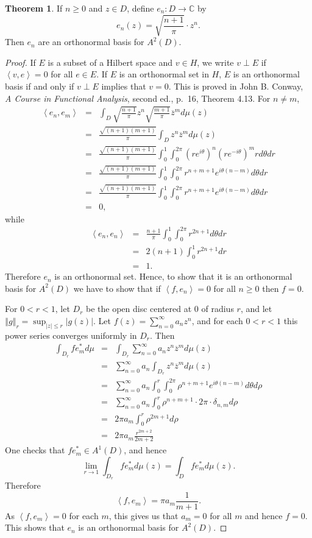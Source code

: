 \documentclass{article}
\newcommand{\inner}[2]{\left\langle #1, #2 \right\rangle}
\newcommand{\norm}[1]{\left\Vert #1 \right\Vert}
\theoremstyle{definition}
\newtheorem{theorem}{Theorem}
\begin{document}
\begin{theorem}
If $n \geq 0$ and $z \in D$, define $e_n:D \to \mathbb{C}$ by 
\[
e_n(z)=\sqrt{\frac{n+1}{\pi}} \cdot z^n.
\]
Then $e_n$ are an orthonormal basis for $A^2(D)$.
\end{theorem}
\begin{proof}
If $E$ is a subset of a Hilbert space and $v \in H$, we write $v \perp E$ if $\inner{v}{e}=0$ for all $e \in E$. If $E$ is an orthonormal set in $H$, $E$ is an orthonormal basis
if and only if $v \perp E$ implies that $v=0$. This is proved in John B. Conway, {\em A Course in Functional Analysis}, second ed., p.~16, Theorem 4.13.
For $n \neq m$,
\begin{eqnarray*}
\inner{e_n}{e_m}&=&\int_D \sqrt{\frac{n+1}{\pi}} z^n \sqrt{\frac{m+1}{\pi}} \overline{z}^m d\mu(z)\\
&=&\frac{ \sqrt{(n+1)(m+1)}}{\pi} \int_D z^n \overline{z}^m d\mu(z)\\
&=&\frac{ \sqrt{(n+1)(m+1)}}{\pi} \int_0^1 \int_0^{2\pi}  (re^{i\theta})^n (re^{-i\theta})^m r d\theta dr\\
&=&\frac{ \sqrt{(n+1)(m+1)}}{\pi} \int_0^1 \int_0^{2\pi}  r^{n+m+1} e^{i\theta(n-m)} d\theta dr\\
&=&\frac{ \sqrt{(n+1)(m+1)}}{\pi} \int_0^1 \int_0^{2\pi}  r^{n+m+1} e^{i\theta(n-m)} d\theta dr\\
&=&0,
\end{eqnarray*}
while
\begin{eqnarray*}
\inner{e_n}{e_n}&=&\frac{n+1}{\pi} \int_0^1 \int_0^{2\pi}  r^{2n+1} d\theta dr\\
&=&2(n+1)\int_0^1 r^{2n+1} dr\\
&=&1.
\end{eqnarray*}
Therefore $e_n$ is an orthonormal set. Hence, to show that it is an orthonormal basis for $A^2(D)$ we have to show that if $\inner{f}{e_n}=0$ for all $n \geq 0$ then
$f=0$.

For $0<r<1$, let $D_r$ be the open disc centered at $0$ of radius $r$, and let $\norm{g}_r=\sup_{|z| \leq r} |g(z)|$. 
Let $f(z)=\sum_{n=0}^\infty a_n z^n$, and for each $0<r<1$ this power series converges uniformly in $D_r$. Then
\begin{eqnarray*}
\int_{D_r} f e_m^* d\mu&=&\int_{D_r} \sum_{n=0}^\infty a_n z^n \overline{z}^m d\mu(z)\\
&=&\sum_{n=0}^\infty a_n \int_{D_r} z^n \overline{z}^m d\mu(z)\\
&=&\sum_{n=0}^\infty a_n \int_0^r \int_0^{2\pi} \rho^{n+m+1} e^{i\theta(n-m)} d\theta d\rho\\
&=&\sum_{n=0}^\infty a_n \int_0^r \rho^{n+m+1} \cdot 2\pi \cdot \delta_{n,m} d\rho\\
&=&2\pi a_m \int_0^r \rho^{2m+1} d\rho \\
&=&2\pi a_m \frac{r^{2m+2}}{2m+2}
\end{eqnarray*}
One checks that $f e_m^* \in A^1(D)$, and hence 
\[
\lim_{r \to 1} \int_{D_r} f e_m^* d\mu(z) = \int_D f e_m^* d\mu(z).
\]
Therefore
\[
\inner{f}{e_m}= \pi a_m \frac{1}{m+1}.
\]
As $\inner{f}{e_m}=0$ for each $m$, this gives us that $a_m=0$ for all $m$ and hence $f=0$. This shows that $e_n$ is an orthonormal basis for $A^2(D)$.
\end{proof}
\end{document}
